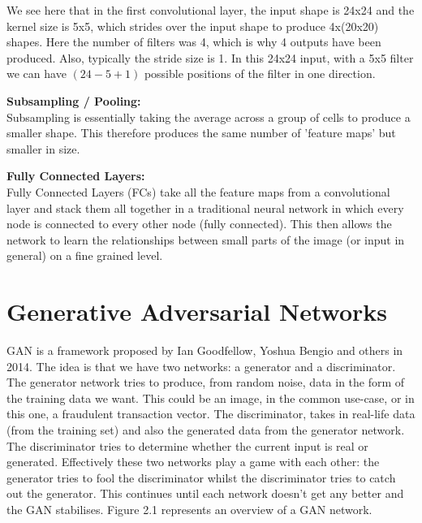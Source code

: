 \documentclass[12pt,a4paper,twoside]{report}
\begin{document}
We see here that in the first convolutional layer, the input shape is 24x24 and the kernel size is 5x5, which strides over the input shape to produce 4x(20x20) shapes. Here the number of filters was 4, which is why 4 outputs have been produced. Also, typically the stride size is 1. In this 24x24 input, with a 5x5 filter we can have $(24-5+1)$ possible positions of the filter in one direction. 

\textbf{Subsampling / Pooling:}\\
Subsampling is essentially taking the average across a group of cells to produce a smaller shape. This therefore produces the same number of 'feature maps' but smaller in size. 

\textbf{Fully Connected Layers:}\\
Fully Connected Layers (FCs) take all the feature maps from a convolutional layer and stack them all together in a traditional neural network in which every node is connected to every other node (fully connected). This then allows the network to learn the relationships between small parts of the image (or input in general) on a fine grained level. 


\section{Generative Adversarial Networks}
GAN is a framework proposed by Ian Goodfellow, Yoshua Bengio and others in 2014. The idea is that we have two networks: a generator and a discriminator. The generator network tries to produce,  from random noise,  data in the form of the training data we want. This could be an image, in the common use-case, or in this one, a fraudulent transaction vector. The discriminator, takes in real-life data (from the training set) and also the generated data from the generator network. The discriminator tries to determine whether the current input is real or generated. Effectively these two networks play a game with each other: the generator tries to fool the discriminator whilst the discriminator tries to catch out the generator. This continues until each network doesn't get any better and the GAN stabilises. Figure 2.1 represents an overview of a GAN network.
\end{document}
